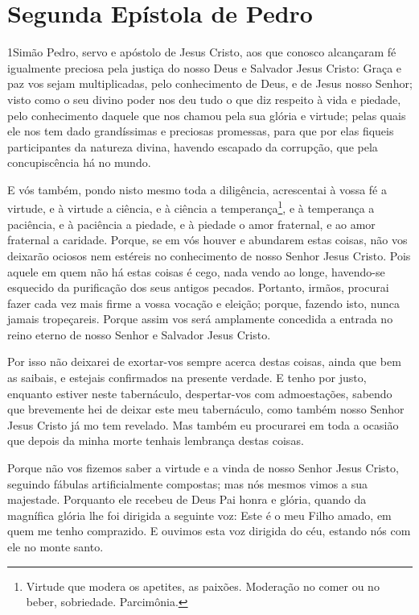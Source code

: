 \thispagestyle{empty}
\chapter*{Segunda Epístola de Pedro}

\lettrine{1} Simão Pedro, servo e apóstolo de Jesus Cristo,
aos que conosco alcançaram fé igualmente preciosa pela justiça do
nosso Deus e Salvador Jesus Cristo: Graça e paz vos sejam
multiplicadas, pelo conhecimento de Deus, e de Jesus nosso Senhor;
visto como o seu divino poder nos deu tudo o que diz respeito à
vida e piedade, pelo conhecimento daquele que nos chamou pela sua
glória e virtude; pelas quais ele nos tem dado grandíssimas e
preciosas promessas, para que por elas fiqueis participantes da
natureza divina, havendo escapado da corrupção, que pela
concupiscência há no mundo.

E vós também, pondo nisto mesmo toda a diligência, acrescentai à
vossa fé a virtude, e à virtude a ciência, e à ciência a
temperança\footnote{Virtude que modera os apetites, as paixões.
Moderação no comer ou no beber, sobriedade. Parcimônia.}, e à
temperança a paciência, e à paciência a piedade, e à piedade o
amor fraternal, e ao amor fraternal a caridade. Porque, se em
vós houver e abundarem estas coisas, não vos deixarão ociosos nem
estéreis no conhecimento de nosso Senhor Jesus Cristo. Pois
aquele em quem não há estas coisas é cego, nada vendo ao longe,
havendo-se esquecido da purificação dos seus antigos pecados.
Portanto, irmãos, procurai fazer cada vez mais firme a vossa
vocação e eleição; porque, fazendo isto, nunca jamais tropeçareis.
Porque assim vos será amplamente concedida a entrada no reino
eterno de nosso Senhor e Salvador Jesus Cristo.

Por isso não deixarei de exortar-vos sempre acerca destas coisas,
ainda que bem as saibais, e estejais confirmados na presente
verdade. E tenho por justo, enquanto estiver neste
tabernáculo, despertar-vos com admoestações, sabendo que
brevemente hei de deixar este meu tabernáculo, como também nosso
Senhor Jesus Cristo já mo tem revelado. Mas também eu
procurarei em toda a ocasião que depois da minha morte tenhais
lembrança destas coisas.

Porque não vos fizemos saber a virtude e a vinda de nosso Senhor
Jesus Cristo, seguindo fábulas artificialmente compostas; mas nós
mesmos vimos a sua majestade. Porquanto ele recebeu de Deus
Pai honra e glória, quando da magnífica glória lhe foi dirigida a
seguinte voz: Este é o meu Filho amado, em quem me tenho comprazido.
E ouvimos esta voz dirigida do céu, estando nós com ele no
monte santo.

